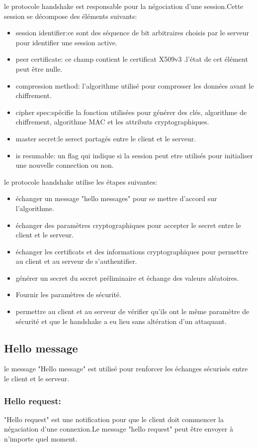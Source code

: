 \documentclass[11pt]{article}
\begin{document}
le protocole handshake est responsable pour la négociation d'une session.Cette session se décompose des éléments suivants:
\begin{itemize}
\item session identifier:ce sont des séquence de bit arbitraires choisis par le serveur pour identifier une session active.

\item peer certificate: ce champ contient le certificat X509v3 .l'état de cet élément peut être nulle.
\item compression method: l'algorithme utilisé pour compresser les données avant le chiffrement.
\item cipher spec:spécifie la fonction utilisées pour générer des clés, algorithme de chiffrement, algorithme MAC et les attributs cryptographiques.
\item master secret:le serect partagés entre le client et le serveur.
\item is resumable: un flag qui indique si la session peut etre utilisés pour initialiser une nouvelle connection ou non.\\
\end{itemize}
le protocole handshake utilise les étapes suivantes:
\begin{itemize}
\item échanger un message "hello messages" pour se mettre d'accord sur l'algorithme.
\item échanger des paramètres cryptographiques pour accepter le secret entre le client et le serveur.
\item échanger les certificats et des informations cryptographiques pour permettre au client et au serveur de s'authentifier. 
\item générer un secret du secret préliminaire et échange des valeurs aléatoires.
\item Fournir les paramètres de sécurité.
\item permettre au client et au serveur de vérifier qu'ils ont le m\^eme paramètre de sécurité et que le handshake a eu lieu sans altération d'un attaquant.
\end{itemize}
\subsection {Hello message}
le message "Hello message" est utilisé pour renforcer les échanges sécurisés entre le client et le serveur.
\subsubsection {Hello request:}
"Hello request" est une notification pour que le client doit commencer la négaciation d'une connexion.Le message "hello request" peut \^etre envoyer à n'importe quel moment.
\end{document}
